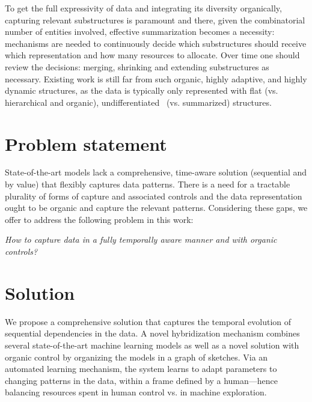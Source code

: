 To get the full expressivity of data and integrating its diversity organically, capturing relevant substructures is paramount and there, given the combinatorial number of entities involved, effective summarization becomes a necessity: mechanisms are needed to continuously decide which substructures should receive which representation and how many resources to allocate. Over time one should review the decisions: merging, shrinking and extending substructures as necessary. Existing work is still far from such organic, highly adaptive, and highly dynamic structures, as the data is typically only represented with flat (vs. hierarchical and organic), undifferentiated~\cite{sun2019bert4rec} (vs. summarized) structures.



\section{Problem statement}
State-of-the-art models lack a comprehensive, time-aware solution (sequential and by value) that flexibly captures data patterns. There is a need for a tractable plurality of forms of capture and associated controls and the data representation ought to be organic and capture the relevant patterns.
%
Considering these gaps, we offer to address the following problem in this work:

\emph{
How to capture data in a fully temporally aware manner and with organic controls?}


\section{Solution}
%
We propose a comprehensive solution that captures the temporal evolution of sequential dependencies in the data. A novel hybridization mechanism combines several state-of-the-art machine learning models as well as a novel solution with organic control by organizing the models in a graph of sketches.
%
Via an automated learning mechanism, the system learns to adapt parameters to changing patterns in the data, within a frame defined by a human---hence balancing resources spent in human control vs. in machine exploration.


